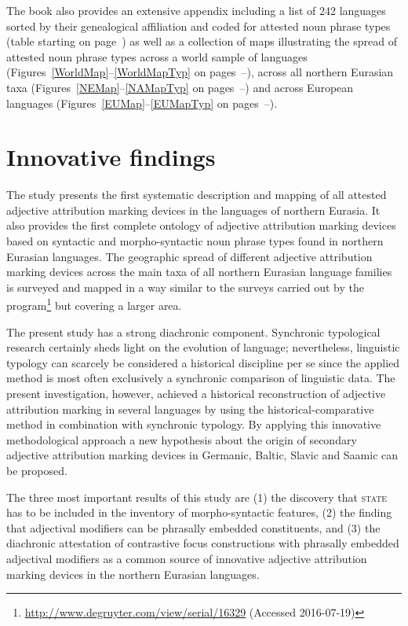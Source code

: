 The book also provides an extensive appendix including a list of 242 languages sorted by their genealogical affiliation and coded for attested noun phrase types (table starting on page~\pageref{sample1}) as well as a collection of maps illustrating the spread of attested noun phrase types across a world sample of languages (Figures~\ref{WorldMap}–\ref{WorldMapTyp} on pages~\pageref{WorldMap}–\pageref{WorldMapTyp}), across all northern Eurasian taxa (Figures~\ref{NEMap}–\ref{NAMapTyp} on pages~\pageref{NEMap}–\pageref{NAMapTyp}) and across European languages (Figures~\ref{EUMap}–\ref{EUMapTyp} on pages~\pageref{EUMap}–\pageref{EUMapTyp}).

\section{Innovative findings}
The study presents the first systematic description and mapping of all attested adjective attribution marking devices in the languages of northern Eurasia. It also provides the first complete ontology of adjective attribution marking devices based on syntactic and morpho-syntactic noun phrase types found in northern Eurasian languages. The geographic spread of different adjective attribution marking devices across the main taxa of all northern Eurasian language families is surveyed and mapped in a way similar to the surveys carried out by the  program\footnote{\url{http://www.degruyter.com/view/serial/16329} (Accessed 2016-07-19)} but covering a larger area.

The present study has a strong diachronic component. Synchronic typological research certainly sheds light on the evolution of language; nevertheless, linguistic typology can scarcely be considered a historical discipline per se since the applied method is most often exclusively a synchronic comparison of linguistic data. The present investigation, however, achieved a historical reconstruction of adjective attribution marking in several languages by using the historical-comparative method in combination with synchronic typology. By applying this innovative methodological approach a new hypothesis about the origin of secondary adjective attribution marking devices in Germanic, Baltic, Slavic and Saamic can be proposed. 

The three most important results of this study are (1) the discovery that \textsc{state} has to be included in the inventory of morpho-syntactic features, (2) the finding that adjectival modifiers can be phrasally embedded constituents, and (3) the diachronic attestation of contrastive focus constructions with phrasally embedded adjectival modifiers as a common source of innovative adjective attribution marking devices in the northern Eurasian languages.

